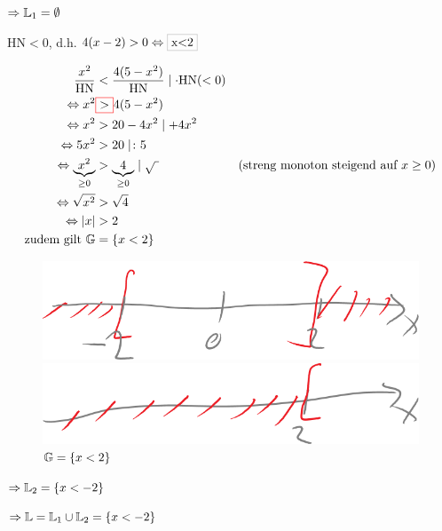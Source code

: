 \begin{enumerate}
	$\Rightarrow \mathbb{L}_1=\emptyset$
	
	 HN$<0$, d.h. $4(x-2)>0\Leftrightarrow\grayframe{x<2}$
	
	\begin{align*}
	\dfrac{x^2}{\text{HN}} &< \dfrac{4(5-x^2)}{\text{HN}}\mid\cdot\text{HN}(<0)\\
	\Leftrightarrow x^2 &{\color{red}\fbox{\color{black}>}}4(5-x^2)\\
	\Leftrightarrow x^2 &>20-4x^2\mid+4x^2\\
	\Leftrightarrow 5x^2 &>20\mid\colon5\\
	\Leftrightarrow \underbrace{x^2}_{\ge0} &>\underbrace{4}_{\ge0}\mid\sqrt{\ }&\text{(streng monoton steigend auf }x\ge0)\\
	\Leftrightarrow \sqrt{x^2} &> \sqrt{4}\\
	\Leftrightarrow |x| &> 2\\
	\text{zudem gilt }\mathbb{G} &= \{x<2\}\\
	\end{align*}
	
	\begin{figure}[h!]
		\centering
		\begin{minipage}{0.4\linewidth-1em}
			\includegraphics[width=\linewidth]{Bilder/129}
			\caption{$|x| > 2$}
		\end{minipage}
		\quad
		\begin{minipage}{0.4\linewidth-1em}
			\includegraphics[width=\linewidth]{Bilder/130}
			\caption{$\mathbb{G}=\{x<2\}$}
		\end{minipage}
	\end{figure}
	
	$\Rightarrow \mathbb{L}_2=\{x<-2\}$
	
	 $\Rightarrow \mathbb{L}=\mathbb{L}_1\cup\mathbb{L}_2=\{x<-2\}$
\end{enumerate}


